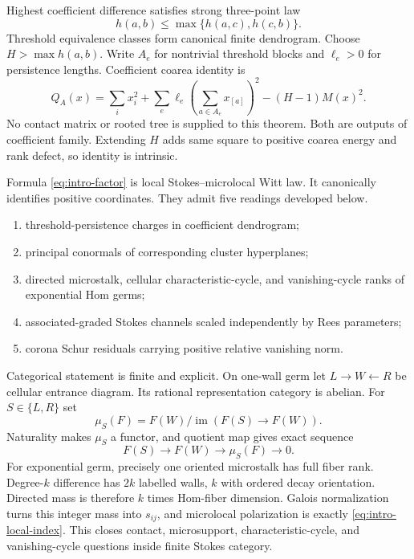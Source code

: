 \documentclass[11pt,a4paper]{amsart}
\theoremstyle{plain}
\theoremstyle{definition}
\begin{document}
Highest coefficient difference satisfies strong three-point law
\begin{equation}\label{eq:intro-ultrametric}
                         h(a,b)\le\max\{h(a,c),h(c,b)\}.
\end{equation}
Threshold equivalence classes form canonical finite dendrogram.  Choose
$H>\max h(a,b)$.  Write $A_e$ for nontrivial threshold blocks and $\ell_e>0$ for persistence
lengths.  Coefficient coarea identity is
\begin{equation}\label{eq:intro-factor}
 \boxed{\quad Q_A(x)=\sum_i x_i^2+
 \sum_e\ell_e\left(\sum_{a\in A_e}x_{[a]}\right)^2
 -(H-1)M(x)^2.\quad}                                      \tag{W}
\end{equation}
No contact matrix or rooted tree is supplied to this theorem.  Both are outputs of coefficient
family.  Extending $H$ adds same square to positive coarea energy and rank defect, so identity is
intrinsic.

Formula \eqref{eq:intro-factor} is local Stokes--microlocal Witt law.  It canonically identifies
positive coordinates.  They admit five readings developed below.
\begin{enumerate}[label=(\roman*),leftmargin=2.2em]
\item threshold-persistence charges in coefficient dendrogram;
\item principal conormals of corresponding cluster hyperplanes;
\item directed microstalk, cellular characteristic-cycle, and vanishing-cycle ranks of
exponential Hom germs;
\item associated-graded Stokes channels scaled independently by Rees parameters;
\item corona Schur residuals carrying positive relative vanishing norm.
\end{enumerate}

Categorical statement is finite and explicit.  On one-wall germ let
$L\to W\leftarrow R$ be cellular entrance diagram.  Its rational representation category is
abelian.  For $S\in\{L,R\}$ set
\[
                         \mu_S(F)=F(W)/\operatorname{im}(F(S)\to F(W)).
\]
Naturality makes $\mu_S$ a functor, and quotient map gives exact sequence
\[
                 F(S)\longrightarrow F(W)\longrightarrow\mu_S(F)\longrightarrow0.
\]
For exponential germ, precisely one oriented microstalk has full fiber rank.  Degree-$k$
difference has $2k$ labelled walls, $k$ with ordered decay orientation.  Directed mass is
therefore $k$ times Hom-fiber dimension.  Galois normalization turns this integer mass into
$s_{ij}$, and microlocal polarization is exactly \eqref{eq:intro-local-index}.  This closes contact,
microsupport, characteristic-cycle, and vanishing-cycle questions inside finite Stokes category.
\end{document}
